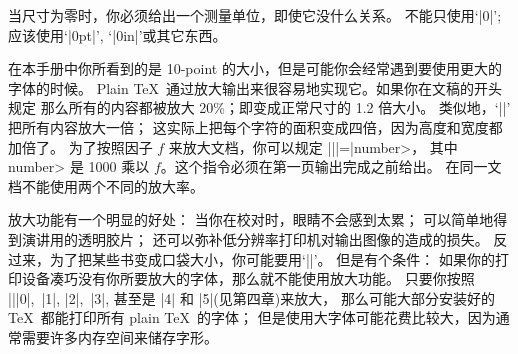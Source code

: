 当尺寸为零时，你必须给出一个测量单位，即使它没什么关系。%
不能只使用`|0|'\thinspace; 应该使用`|0pt|', `|0in|'或其它东西。

\smallbreak
在本手册中你所看到的是 10-point 的大小，但是可能你会经常遇到要使用更大的字体的时候。
Plain \TeX\ 通过放大输出来很容易地实现它。如果你在文稿的开头规定
\begintt
{}
\endtt
那么所有的内容都被放大 20\%；即变成正常尺寸的 1.2 倍大小。
类似地，`||' 把所有内容放大一倍；
这实际上把每个字符的面积变成四倍，因为高度和宽度都加倍了。
为了按照因子 $f$ 来放大文档，你可以规定 |\magnification||=|\<number>，
其中 \<number> 是 1000 乘以 $f$。这个指令必须在第一页输出完成之前给出。
在同一文档不能使用两个不同的放大率。

放大功能有一个明显的好处：
当你在校对时，眼睛不会感到太累；
可以简单地得到演讲用的透明胶片；
还可以弥补低分辨率打印机对输出图像的造成的损失。%
反过来，为了把某些书变成口袋大小，你可能要用`||'。%
但是有个条件：
如果你的打印设备凑巧没有你所要放大的字体，那么就不能使用放大功能。%
只要你按照 |\magstep||0|,~|1|, |2|,~|3|, 甚至是 |4| 和 |5|(见第四章)来放大，
那么可能大部分安装好的 \TeX\ 都能打印所有 plain \TeX\ 的字体；
但是使用大字体可能花费比较大，因为通常需要许多内存空间来储存字形。

